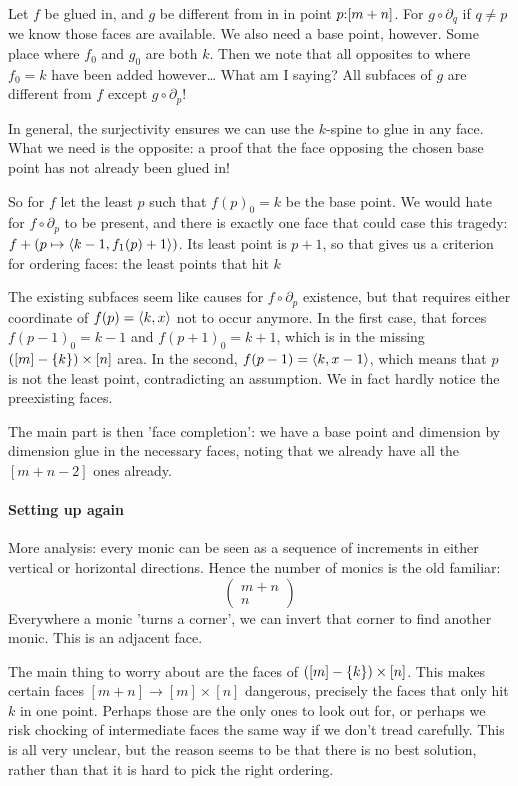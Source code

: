 \documentclass[csh.tex]{subfiles}
\begin{document}
Let $f$ be glued in, and $g$ be different from in in point $p\mathord :[m+n]$. For $g\circ \partial_q$ if $q\neq p$ we know those faces are available.
We also need a base point, however. Some place where $f_0$ and $g_0$ are both $k$.
Then we note that all opposites to where $f_0=k$ have been added however\dots
What am I saying? All subfaces of $g$ are different from $f$ except $g\circ \partial_p$!

In general, the surjectivity ensures we can use the $k$-spine to glue in any face. What we need is the opposite:
a proof that the face opposing the chosen base point has not already been glued in!

So for $f$ let the least $p$ such that $f(p)_0=k$ be the base point. We would hate for $f\circ\partial_p$ to be present, and there is exactly one face that could case this tragedy: $f + (p \mapsto \left\langle k-1,f_1(p)+1 \right\rangle)$. Its least point is $p+1$, so that gives us a criterion for ordering faces: the least points that hit $k$ 

The existing subfaces seem like causes for $f\circ\partial_p$ existence, but that requires either coordinate of $f(p) = \left\langle k,x \right\rangle$ not to occur anymore.
In the first case, that forces $f(p-1)_0=k-1$ and $f(p+1)_0=k+1$, which is in the missing $([m]-\left\{k\right\})\times [n]$ area. In the second, $f(p-1) = \left\langle k,x-1 \right\rangle$, which means that $p$ is not the least point, contradicting an assumption. We in fact hardly notice the preexisting faces.

The main part is then 'face completion': we have a base point and dimension by dimension glue in the necessary faces, noting that we already have all the $[m+n-2]$ ones already.

\paragraph{Setting up again}
More analysis: every monic can be seen as a sequence of increments in either vertical or horizontal directions. Hence the number of monics is the old familiar:
\[ \left(\begin{array}{c}m+n\\n\end{array}\right) \] 
Everywhere a monic 'turns a corner', we can invert that corner to find another monic. This is an adjacent face. 

The main thing to worry about are the faces of $([m]-\left\{k\right\})\times [n]$. This makes certain faces $[m+n] \to [m]\times [n]$ dangerous,
precisely the faces that only hit $k$ in one point. Perhaps those are the only ones to look out for, or perhaps we risk chocking of intermediate faces the same way if we don't tread carefully. This is all very unclear, but the reason seems to be that there is no best solution, rather than that it is hard to pick the right ordering.
\end{document}
